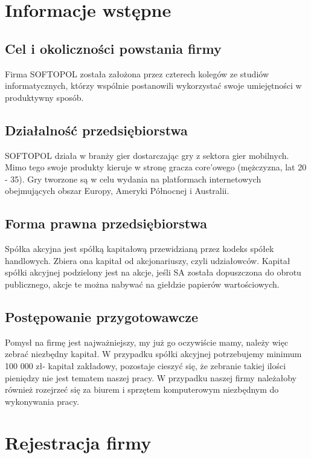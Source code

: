 \documentclass[11pt]{article}
\begin{document}
	\tableofcontents
	\cleardoublepage
	\setcounter{page}{2}
	
	
	\section{Informacje wstępne}
	
	\subsection{Cel i okoliczności powstania firmy}
		Firma SOFTOPOL została założona przez czterech kolegów ze studiów informatycznych, którzy wspólnie postanowili wykorzystać swoje umiejętności w produktywny sposób.
		
	\subsection{Działalność przedsiębiorstwa}
	
		SOFTOPOL działa w branży gier dostarczając gry z sektora gier mobilnych. Mimo tego swoje produkty kieruje w stronę gracza core'owego (mężczyzna, lat 20 - 35). Gry tworzone są w celu wydania na platformach internetowych obejmujących obszar Europy, Ameryki Północnej i Australii.
	
	\subsection{Forma prawna przedsiębiorstwa}
	
	Spółka akcyjna jest spółką kapitałową przewidzianą przez kodeks spółek handlowych. Zbiera ona kapitał od akcjonariuszy, czyli udziałowców.
Kapitał spółki akcyjnej podzielony jest na akcje, jeśli SA została dopuszczona do obrotu publicznego, akcje te można nabywać na giełdzie papierów wartościowych.

	\subsection{Postępowanie przygotowawcze}
	
	Pomysł na firmę jest najważniejszy, my już go oczywiście mamy, należy więc zebrać niezbędny kapitał.
	W przypadku spółki akcyjnej potrzebujemy minimum 100 000 zł- kapitał zakładowy, pozostaje cieszyć się, że zebranie takiej ilości pieniędzy nie jest tematem naszej pracy. W przypadku naszej firmy należałoby również rozejrzeć się za biurem i sprzętem komputerowym niezbędnym do wykonywania pracy.
	
	\section{Rejestracja firmy}
\end{document}

